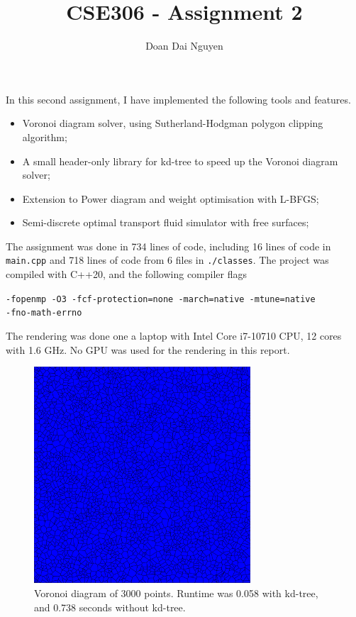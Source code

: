 \documentclass{amsart}
\title{CSE306 - Assignment 2}
\author{Doan Dai Nguyen}
\begin{document}
\maketitle

In this second assignment, I have implemented the following tools and features.

\begin{itemize}
    \item Voronoi diagram solver, using Sutherland-Hodgman polygon clipping algorithm;
    \item A small header-only library for kd-tree to speed up the Voronoi diagram solver;
    \item Extension to Power diagram and weight optimisation with L-BFGS;
    \item Semi-discrete optimal transport fluid simulator with free surfaces;
\end{itemize}

The assignment was done in 734 lines of code, including 16 lines of code in \texttt{main.cpp} and 718 lines of code from 6 files in \texttt{./classes}. The project was compiled with C++20, and the following compiler flags

\texttt{-fopenmp -O3 -fcf-protection=none -march=native -mtune=native \\-fno-math-errno}

The rendering was done one a laptop with Intel Core i7-10710 CPU, 12 cores with 1.6 GHz. No GPU was used for the rendering in this report.

\begin{figure}
    \centering
    \includegraphics[width=0.72\textwidth]{img/voronoi_p.png}
    \caption{Voronoi diagram of 3000 points. Runtime was 0.058 with kd-tree, and 0.738 seconds without kd-tree.}
    \label{fig1}
\end{figure}
\end{document}

